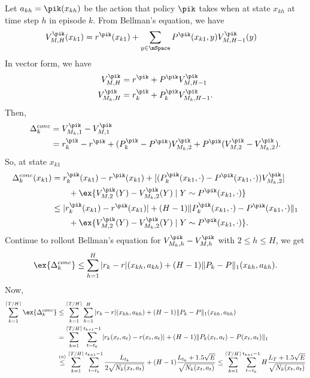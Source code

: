             Let $a_{kh}=\pik(x_{kh})$ be the action that policy $\pik$ takes when at state $x_{kh}$ at time step $h$ in episode $k$. From Bellman's equation, we have
            \begin{align*}
                V^{\pik}_{M,H}(x_{k1})
                &= r^{\pik}(x_{k1}) +\sum_{y\in\mSpace}P^{\pik}(x_{k1},y)V^{\pik}_{M,H-1}(y)
            \end{align*}
            In vector form, we have
            \begin{align*}
                V^{\pik}_{M,H} &= r^{\pik} +P^{\pik}V^{\pik}_{M,H-1} \\
                V^{\pik}_{M_k,H} &= r^{\pik}_k +P^{\pik}_kV^{\pik}_{M_k,H-1}.
            \end{align*}
            Then,
            \begin{align*}
                \Delta_k^{conc}
                &= V^{\pik}_{M_k,1} -V^{\pik}_{M,1} \\
                &= r^{\pik}_k-r^{\pik} +(P^{\pik}_k -P^{\pik})V^{\pik}_{M_k,2} +P^{\pik}(V^{\pik}_{M,2}-V^{\pik}_{M_k,2}).
            \end{align*}
            So, at state $x_{k1}$
            \begin{align*}
                \Delta_k^{conc}(x_{k1})
                &= r^{\pik}_k(x_{k1})-r^{\pik}(x_{k1}) +[(P^{\pik}_k(x_{k1},\cdot) -P^{\pik}(x_{k1},\cdot))V^{\pik}_{M_k,2}] \\
                &\qquad +\ex{V^{\pik}_{M,2}(Y)-V^{\pik}_{M_k,2}(Y) \mid Y\sim P^{\pik}(x_{k1},\cdot)} \\
                &\le \vert r^{\pik}_k(x_{k1}) -r^{\pik}(x_{k1})\vert +(H-1)\Vert P^{\pik}_k(x_{k1},\cdot) -P^{\pik}(x_{k1},\cdot)\Vert_1 \\
                &\qquad +\ex{V^{\pik}_{M,2}(Y)-V^{\pik}_{M_k,2}(Y) \mid Y\sim P^{\pik}(x_{k1},\cdot)}.
            \end{align*}
            Continue to rollout Bellman's equation for $V^{\pik}_{M_k,h}-V^{\pik}_{M,h}$ with $2\le h\le H$, we get
            \begin{align*}
                \ex{\Delta_k^{conc}} \le \sum_{h=1}^{H}\vert r_k-r\vert(x_{kh},a_{kh}) +(H-1)\Vert P_k -P\Vert_1(x_{kh},a_{kh}).
            \end{align*}
            Now,
            \begin{align*}
                \sum_{k=1}^{\lceil T/H\rceil}\ex{\Delta_k^{conc}}
                &\le \sum_{k=1}^{\lceil T/H\rceil} \sum_{h=1}^{H}\vert r_k-r\vert(x_{kh},a_{kh}) +(H-1)\Vert P_k -P\Vert_1(x_{kh},a_{kh}) \\
                &=\sum_{k=1}^{\lceil T/H\rceil} \sum_{t=t_k}^{t_{k+1}-1}\vert r_k(x_t,a_t)-r(x_t,a_t)\vert +(H-1)\Vert P_k(x_t,a_t) -P(x_t,a_t)\Vert_1 \\
                &\overset{(a)}\le \sum_{k=1}^{\lceil T/H\rceil} \sum_{t=t_k}^{t_{k+1}-1} \frac{L_{t_k}}{2\sqrt{N_k(x_t,a_t)}} +(H-1)\frac{L_{t_k}+1.5\sqrt{E}}{\sqrt{N_k(x_t,a_t)}} \le\sum_{k=1}^{\lceil T/H\rceil} \sum_{t=t_k}^{t_{k+1}-1}H\frac{L_T+1.5\sqrt{E}}{\sqrt{N_k(x_t,a_t)}}
            \end{align*}
